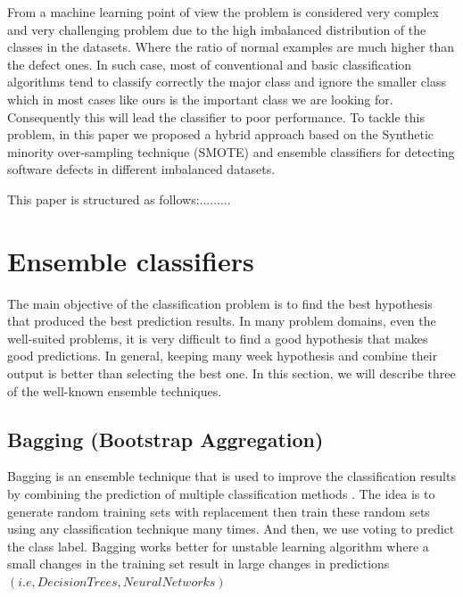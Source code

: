 \documentclass[runningheads,a4paper]{llncs}
\begin{document}


 
 From a machine learning point of view the problem is considered very complex and very challenging problem due to the high imbalanced distribution of the classes in the datasets. Where the ratio of normal examples are much higher than the defect ones. In such case, most of conventional and basic classification algorithms tend to classify correctly the major class and ignore the smaller class which in most cases like ours is the important class we are looking for. Consequently this will lead the classifier to poor performance. To tackle this problem, in this paper we proposed a hybrid approach based on the Synthetic minority over-sampling technique (SMOTE) and ensemble classifiers for detecting software defects in different imbalanced datasets.
 

This paper is structured as follows:.........






\section{Ensemble classifiers}
\label{ensembles}
The main objective of the classification problem is to find the best hypothesis that produced the best prediction results. In many problem domains, even the well-suited problems, it is very difficult to find a good hypothesis that makes good predictions. In general, keeping many week hypothesis and combine their output is better than selecting the best one.
In this section, we will describe three of the well-known ensemble techniques.

\subsection{Bagging (Bootstrap Aggregation)}
Bagging is an ensemble technique that is used to improve the classification results by combining the prediction of multiple classification methods \cite{Breiman1996}. The idea is to generate random training sets with replacement then train these random sets using any classification technique many times. And then, we use voting to predict the class label.
Bagging works better for unstable  learning algorithm where a small changes in the training set result in large changes in predictions $(i.e, Decision Trees,  Neural Networks)$
\end{document}

